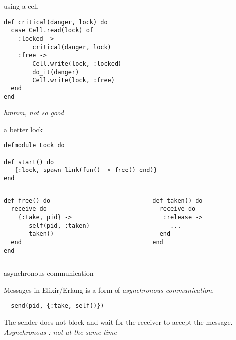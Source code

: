 \begin{frame}[fragile]{using a cell}

\pause\vspace{20pt}

\begin{verbatim}
def critical(danger, lock) do
  case Cell.read(lock) of
    :locked ->
        critical(danger, lock)
    :free ->
        Cell.write(lock, :locked)
        do_it(danger)
        Cell.write(lock, :free)
  end
end 
\end{verbatim}

\pause\vspace{20pt}
{\em hmmm, not so good}

\end{frame}

\begin{frame}[fragile]{a better lock}

\begin{verbatim}
defmodule Lock do

def start() do
   {:lock, spawn_link(fun() -> free() end)}
end
\end{verbatim}
\begin{columns}
  \begin{column}{0.5\linewidth}
\begin{verbatim}
def free() do
  receive do
    {:take, pid} ->
       self(pid, :taken)
       taken()
  end
end
\end{verbatim}
  \end{column}
  \begin{column}{0.5\linewidth}
\begin{verbatim}  
def taken() do
  receive do
   :release ->
     ...
  end
end

\end{verbatim}
  \end{column}
\end{columns}
\end{frame}


\begin{frame}[fragile]{asynchronous communication}

Messages in Elixir/Erlang is a form of {\em asynchronous communication}.

\pause\vspace{20pt}
\begin{verbatim}
  send(pid, {:take, self()})
\end{verbatim}

\pause\vspace{20pt}
The sender does not block and wait for the receiver to accept the message. 
\pause\vspace{20pt}
{\em Asynchronous : not at the same time}
\end{frame}

